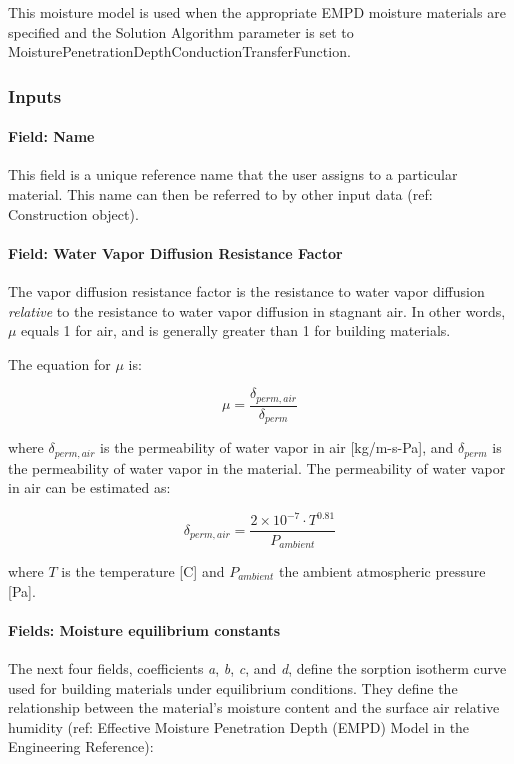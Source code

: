 This moisture model is used when the appropriate EMPD moisture
materials are specified and the Solution Algorithm parameter is set to
MoisturePenetrationDepthConductionTransferFunction.

\subsubsection{Inputs}\label{empd-inputs}

\paragraph{Field: Name}\label{field-name}

This field is a unique reference name that the user assigns to a
particular material. This name can then be referred to by other input
data (ref: Construction object).

\paragraph{Field: Water Vapor Diffusion Resistance
	Factor}\label{field-water-vapor-diffusion-resistance-factor}

The vapor diffusion resistance factor is the resistance to water vapor
diffusion \emph{relative} to the resistance to water vapor diffusion in
stagnant air. In other words, \(\mu\) equals 1 for air, and is generally
greater than 1 for building materials.

The equation for \(\mu\) is:

\[ \mu = \frac {\delta_{perm,air}} {\delta_{perm}} \]

where \(\delta_{perm,air}\) is the permeability of water vapor in air
{[}kg/m-s-Pa{]}, and \(\delta_{perm}\) is the permeability of water
vapor in the material. The permeability of water vapor in air can be
estimated as:

\[ \delta_{perm,air} = \frac {2 \times 10^{-7} \cdot T^{0.81}} {P_{ambient}} \]

where \(T\) is the temperature {[}C{]} and \(P_{ambient}\) the ambient
atmospheric pressure {[}Pa{]}.

\paragraph{Fields: Moisture equilibrium
	constants}\label{fields-moisture-equilibrium-constants}

The next four fields, coefficients \emph{a}, \emph{b}, \emph{c}, and \emph{d},
define the sorption isotherm curve used for building materials under
equilibrium conditions. They define the relationship between
the material's moisture content and the surface air relative humidity
(ref: Effective Moisture Penetration Depth (EMPD) Model in the
Engineering Reference):


